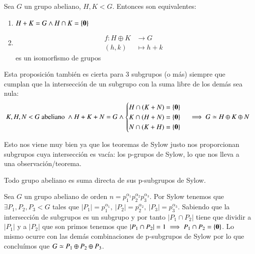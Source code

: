 \begin{pro}
	\label{pro:abelianosumadirecta}
	Sea $G$ un grupo abeliano, $H, K < G$. Entonces son equivalentes:
	\begin{enumerate}
		\item $H+K = G \land H \cap K = \{\mathbf{0}\}$
		\item \begin{align*}
			f:H\oplus K &\to G\\
			(h,k) &\mapsto h+k
		\end{align*}
		es un isomorfismo de grupos
	\end{enumerate}
\end{pro}

\begin{obs}
	Esta proposición también es cierta para 3 subgrupos (o más) siempre que cumplan que la intersección de un subgrupo con la suma libre de los demás sea nula:
	\begin{align*}
		K,H, N < G \text{ abeliano } \land H + K + N = G \land \begin{cases}
		H \cap (K+N) = \{\mathbf{0}\} \\
		K \cap (H+N) = \{\mathbf{0}\} \\
		N \cap (K+H) = \{\mathbf{0}\}
		\end{cases} \implies G \simeq H \oplus K \oplus N
	\end{align*}
\end{obs}

Esto nos viene muy bien ya que los teoremas de Sylow justo nos proporcionan subgrupos cuya intersección es vacía: los p-grupos de Sylow, lo que nos lleva a una observación/teorema.

\begin{thm}
	Todo grupo abeliano es suma directa de sus p-subgrupos de Sylow.
\end{thm}

\begin{ej}
	Sea $G$ un grupo abeliano de orden $n = p_1^{\alpha_1}p_2^{\alpha_2}p_3^{\alpha_3}$. Por Sylow tenemos
	que $\exists P_1, P_2, P_3 < G$ tales que $|P_1| = p_1^{\alpha_1},\ |P_2| = p_2^{\alpha_2},\ |P_3| = p_3^{\alpha_3}$. Sabiendo que la intersección de subgrupos es un subgrupo y por tanto $|P_1 \cap P_2|$ tiene que dividir a $|P_1|$ y a $|P_2|$ que son primos tenemos que $|P_1\cap P_2| = 1 \implies P_1 \cap P_2 = \{\mathbf{0}\}$. Lo mismo ocurre con las demás combinaciones de p-subgrupos de Sylow por lo que concluímos que $G \simeq P_1 \oplus P_2 \oplus P_3$.
\end{ej}

